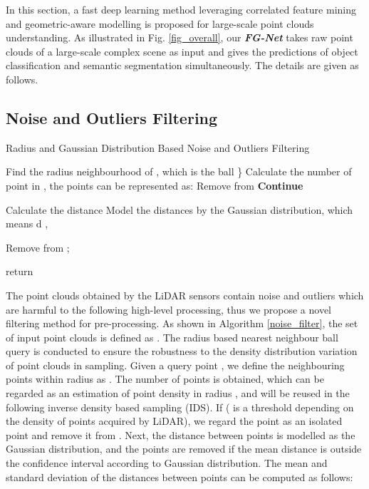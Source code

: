 \documentclass[journal]{IEEEtran}
\begin{document}
In this section, a fast deep learning method leveraging correlated feature mining and geometric-aware modelling is proposed for large-scale point clouds understanding.  
As illustrated in Fig. \ref{fig_overall}, our \textit{\textbf{FG-Net}} takes raw point clouds of a large-scale complex scene as input and gives the predictions of object classification and semantic segmentation simultaneously. The details are given as follows.
\subsection{Noise and Outliers Filtering}

\begin{algorithm}
\caption{Radius and Gaussian Distribution Based Noise and Outliers Filtering} 
        { 
            Find the radius  neighbourhood of , which is the ball \}\; 
            Calculate the number of point  in , the points can be represented as: \;
                {Remove  from \;
                 \;
                \textbf{Continue}}
             {
             Calculate the distance \; 
             Model the distances by the Gaussian distribution, which means d ,
             
             {Remove  from ;}
            } 
            \; 
        } 
        return \; 
\label{noise_filter}
\end{algorithm}
The point clouds obtained by the LiDAR sensors contain noise and outliers which are harmful to the following high-level processing, thus we propose a novel filtering method for pre-processing. As shown in Algorithm \ref{noise_filter}, the set of input point clouds is defined as . The radius based nearest neighbour ball query is conducted to ensure the robustness to the density distribution variation of point clouds in sampling. Given a query point , we define the neighbouring points within radius  as . The number of points  is obtained, which can be regarded as an estimation of point density in radius , and will be reused in the following inverse density based sampling (IDS).  If  ( is a threshold depending on the density of points acquired by LiDAR), we regard the point as an isolated point and remove it from . Next, the distance between points is modelled as the Gaussian distribution, and the points are removed if the mean distance is outside the confidence interval according to Gaussian distribution.  The mean  and standard deviation  of the distances between points can be computed as follows:
\end{document}
